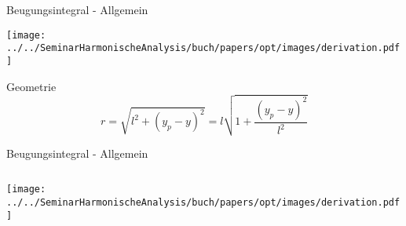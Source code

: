 \begin{frame}{Beugungsintegral - Allgemein}
    \begin{center}
        \texttt{[image: ../../SeminarHarmonischeAnalysis/buch/papers/opt/images/derivation.pdf]}
    \end{center}
    \begin{block}{Geometrie}
        \begin{equation*}
            r
            =
            \sqrt{l^2 + (y_p-y)^2}
            =
            l \sqrt{1 + \frac{(y_p-y)^2}{l^2}}
        \end{equation*}
    \end{block}
\end{frame}

\begin{frame}{Beugungsintegral - Allgemein}
    \begin{columns}
        \begin{column}{0.475\textwidth}
            \centering
            \texttt{[image: ../../SeminarHarmonischeAnalysis/buch/papers/opt/images/derivation.pdf]}
        \end{column}


\end{columns}
\end{frame}
